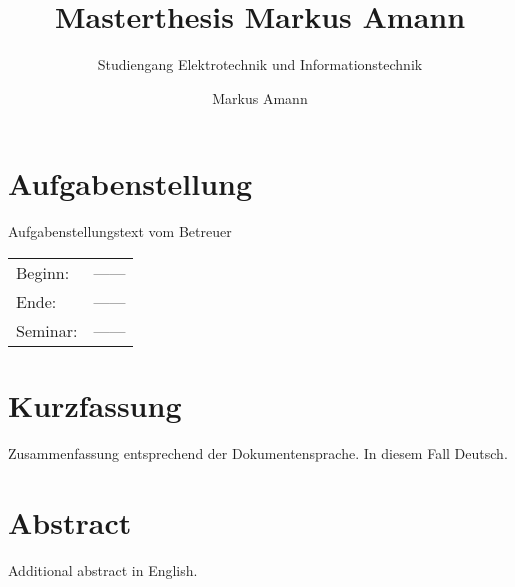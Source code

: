 
\title{Masterthesis Markus Amann}
\subtitle{\textmd{Studiengang Elektrotechnik und Informationstechnik}}
\author[Markus Amann]{Markus Amann}




\lowertitleback{
	Technische Universität Darmstadt\\
	Institut für Automatisierungstechnik und Mechatronik\\
	Fachgebiet Regelungstechnik und Mechatronik\\
	Prof. Dr.-Ing. Ulrich Konigorski\\
}

\frontmatter
\maketitle

\clearpage
\setcounter{page}{1}
\section*{Aufgabenstellung}

Aufgabenstellungstext vom Betreuer

\vspace{0.5cm}
\begin{tabular}{ll}
	Beginn: 	& ------ \\
	Ende: 		& ------ \\
	Seminar: 	& ------ \\
\end{tabular}
\clearpage

\affidavit

\section*{Kurzfassung}
Zusammenfassung entsprechend der Dokumentensprache. In diesem Fall Deutsch.
\section*{Abstract}
Additional abstract in English.	

\cleardoublepage

\tableofcontents
\cleardoublepage

\mainmatter
